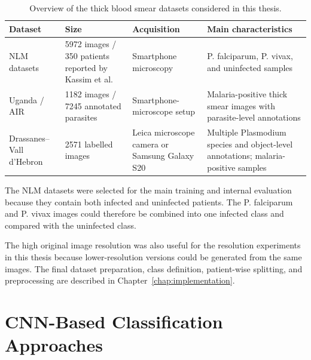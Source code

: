 \begin{table}[htbp]
    \centering
    \caption{Overview of the thick blood smear datasets considered in this thesis.}
    \label{tab:malaria_datasets}
    \begin{tabularx}{\textwidth}{|p{2.7cm}|X|X|X|}
        \hline
        \textbf{Dataset} &
        \textbf{Size} &
        \textbf{Acquisition} &
        \textbf{Main characteristics} \\
        \hline

        NLM datasets &
        5972 images / 350 patients reported by Kassim et al. &
        Smartphone microscopy &
        P. falciparum, P. vivax, and uninfected samples \cite{Yang2020,Kassim2021} \\
        \hline

        Uganda / AIR &
        1182 images / 7245 annotated parasites &
        Smartphone-microscope setup &
        Malaria-positive thick smear images with parasite-level annotations \cite{Quinn2016} \\
        \hline

        Drassanes--Vall d'Hebron &
        2571 labelled images &
        Leica microscope camera or Samsung Galaxy S20 &
        Multiple Plasmodium species and object-level annotations; malaria-positive samples \cite{VallHebron2025} \\
        \hline

    \end{tabularx}
\end{table}

\FloatBarrier

The NLM datasets were selected for the main training and internal evaluation because they contain both infected and uninfected patients. The P. falciparum and P. vivax images could therefore be combined into one infected class and compared with the uninfected class.

The high original image resolution was also useful for the resolution experiments in this thesis because lower-resolution versions could be generated from the same images. The final dataset preparation, class definition, patient-wise splitting, and preprocessing are described in Chapter~\ref{chap:implementation}.

\section{CNN-Based Classification Approaches}
\label{sec:cnn_classification}

